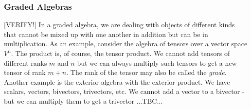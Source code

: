 


\subsubsection{Graded Algebras} [VERIFY!]
In a graded algebra, we are dealing with objects of different kinds that cannot be mixed up with one another in addition but can be in multiplication. As an example, consider the algebra of tensors over a vector space $V^n$. The product is, of course, the tensor product. We cannot add tensors of different ranks $m$ and $n$ but we can always multiply such tensors to get a new tensor of rank $m+n$. The rank of the tensor may also be called the \emph{grade}. Another example is the exterior algebra with the exterior product. We have scalars, vectors, bivectors, trivectors, etc. We cannot add a vector to a bivector - but we can multiply them to get a trivector ...TBC...







